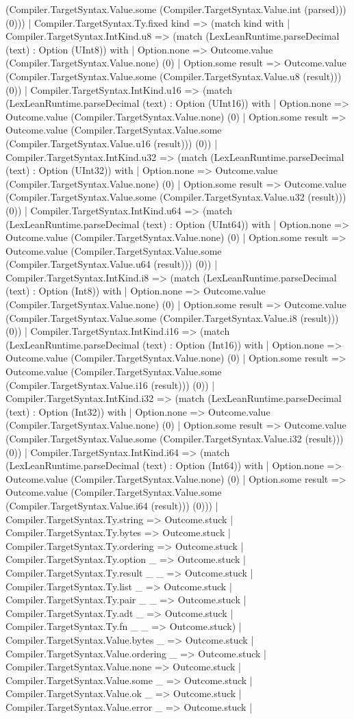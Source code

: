\documentclass[11pt]{article}
\begin{document}
(Compiler.TargetSyntax.Value.some (Compiler.TargetSyntax.Value.int (parsed))) (0))) | Compiler.TargetSyntax.Ty.fixed kind => (match kind with | Compiler.TargetSyntax.IntKind.u8 => (match (LexLeanRuntime.parseDecimal (text) : Option (UInt8)) with | Option.none => Outcome.value (Compiler.TargetSyntax.Value.none) (0) | Option.some result => Outcome.value (Compiler.TargetSyntax.Value.some (Compiler.TargetSyntax.Value.u8 (result))) (0)) | Compiler.TargetSyntax.IntKind.u16 => (match (LexLeanRuntime.parseDecimal (text) : Option (UInt16)) with | Option.none => Outcome.value (Compiler.TargetSyntax.Value.none) (0) | Option.some result => Outcome.value (Compiler.TargetSyntax.Value.some (Compiler.TargetSyntax.Value.u16 (result))) (0)) | Compiler.TargetSyntax.IntKind.u32 => (match (LexLeanRuntime.parseDecimal (text) : Option (UInt32)) with | Option.none => Outcome.value (Compiler.TargetSyntax.Value.none) (0) | Option.some result => Outcome.value (Compiler.TargetSyntax.Value.some (Compiler.TargetSyntax.Value.u32 (result))) (0)) | Compiler.TargetSyntax.IntKind.u64 => (match (LexLeanRuntime.parseDecimal (text) : Option (UInt64)) with | Option.none => Outcome.value (Compiler.TargetSyntax.Value.none) (0) | Option.some result => Outcome.value (Compiler.TargetSyntax.Value.some (Compiler.TargetSyntax.Value.u64 (result))) (0)) | Compiler.TargetSyntax.IntKind.i8 => (match (LexLeanRuntime.parseDecimal (text) : Option (Int8)) with | Option.none => Outcome.value (Compiler.TargetSyntax.Value.none) (0) | Option.some result => Outcome.value (Compiler.TargetSyntax.Value.some (Compiler.TargetSyntax.Value.i8 (result))) (0)) | Compiler.TargetSyntax.IntKind.i16 => (match (LexLeanRuntime.parseDecimal (text) : Option (Int16)) with | Option.none => Outcome.value (Compiler.TargetSyntax.Value.none) (0) | Option.some result => Outcome.value (Compiler.TargetSyntax.Value.some (Compiler.TargetSyntax.Value.i16 (result))) (0)) | Compiler.TargetSyntax.IntKind.i32 => (match (LexLeanRuntime.parseDecimal (text) : Option (Int32)) with | Option.none => Outcome.value (Compiler.TargetSyntax.Value.none) (0) | Option.some result => Outcome.value (Compiler.TargetSyntax.Value.some (Compiler.TargetSyntax.Value.i32 (result))) (0)) | Compiler.TargetSyntax.IntKind.i64 => (match (LexLeanRuntime.parseDecimal (text) : Option (Int64)) with | Option.none => Outcome.value (Compiler.TargetSyntax.Value.none) (0) | Option.some result => Outcome.value (Compiler.TargetSyntax.Value.some (Compiler.TargetSyntax.Value.i64 (result))) (0))) | Compiler.TargetSyntax.Ty.string => Outcome.stuck | Compiler.TargetSyntax.Ty.bytes => Outcome.stuck | Compiler.TargetSyntax.Ty.ordering => Outcome.stuck | Compiler.TargetSyntax.Ty.option \_ => Outcome.stuck | Compiler.TargetSyntax.Ty.result \_ \_ => Outcome.stuck | Compiler.TargetSyntax.Ty.list \_ => Outcome.stuck | Compiler.TargetSyntax.Ty.pair \_ \_ => Outcome.stuck | Compiler.TargetSyntax.Ty.adt \_ => Outcome.stuck | Compiler.TargetSyntax.Ty.fn \_ \_ => Outcome.stuck) | Compiler.TargetSyntax.Value.bytes \_ => Outcome.stuck | Compiler.TargetSyntax.Value.ordering \_ => Outcome.stuck | Compiler.TargetSyntax.Value.none => Outcome.stuck | Compiler.TargetSyntax.Value.some \_ => Outcome.stuck | Compiler.TargetSyntax.Value.ok \_ => Outcome.stuck | Compiler.TargetSyntax.Value.error \_ => Outcome.stuck | 
\end{document}

